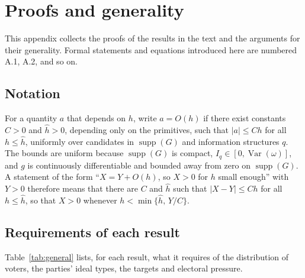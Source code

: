 \documentclass[12pt,letterpaper]{article}
\begin{document}
\clearpage
\appendix
\section{Proofs and generality}\label{app:proofs}
\setcounter{equation}{0}
\setcounter{lemma}{0}
\setcounter{proposition}{0}
\setcounter{corollary}{0}
\setcounter{assumption}{0}

This appendix collects the proofs of the results in the text and the arguments for their generality. Formal statements and equations introduced here are numbered A.1, A.2, and so on.

\subsection*{Notation}
For a quantity $a$ that depends on $h$, write $a=O(h)$ if there exist constants $C>0$ and $\hat h>0$, depending only on the primitives, such that $|a|\le Ch$ for all $h\le\hat h$, uniformly over candidates in $\operatorname{supp}(G)$ and information structures $q$. The bounds are uniform because $\operatorname{supp}(G)$ is compact, $I_q\in[0,\operatorname{Var}(\omega)]$, and $g$ is continuously differentiable and bounded away from zero on $\operatorname{supp}(G)$. A statement of the form ``$X=Y+O(h)$, so $X>0$ for $h$ small enough'' with $Y>0$ therefore means that there are $C$ and $\hat h$ such that $|X-Y|\le Ch$ for all $h\le\hat h$, so that $X>0$ whenever $h<\min\{\hat h,\,Y/C\}$.

\subsection*{Requirements of each result}
Table~\ref{tab:general} lists, for each result, what it requires of the distribution of voters, the parties' ideal types, the targets and electoral pressure.
\end{document}
